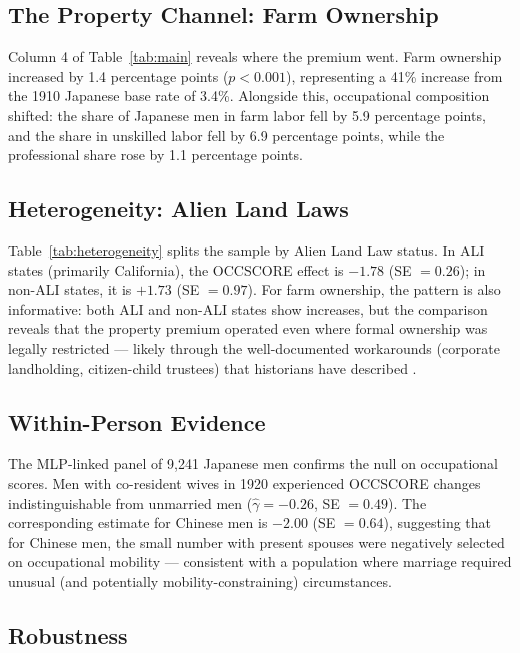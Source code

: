 \documentclass[12pt]{article}
\begin{document}
\subsection{The Property Channel: Farm Ownership}

Column 4 of Table~\ref{tab:main} reveals where the premium went. Farm ownership increased by 1.4 percentage points ($p < 0.001$), representing a 41\% increase from the 1910 Japanese base rate of 3.4\%. Alongside this, occupational composition shifted: the share of Japanese men in farm labor fell by 5.9 percentage points, and the share in unskilled labor fell by 6.9 percentage points, while the professional share rose by 1.1 percentage points.

\subsection{Heterogeneity: Alien Land Laws}



Table~\ref{tab:heterogeneity} splits the sample by Alien Land Law status. In ALI states (primarily California), the OCCSCORE effect is $-1.78$ (SE $= 0.26$); in non-ALI states, it is $+1.73$ (SE $= 0.97$). For farm ownership, the pattern is also informative: both ALI and non-ALI states show increases, but the comparison reveals that the property premium operated even where formal ownership was legally restricted --- likely through the well-documented workarounds (corporate landholding, citizen-child trustees) that historians have described \citep{arai2020alien}.

\subsection{Within-Person Evidence}

The MLP-linked panel of 9,241 Japanese men confirms the null on occupational scores. Men with co-resident wives in 1920 experienced OCCSCORE changes indistinguishable from unmarried men ($\hat{\gamma} = -0.26$, SE $= 0.49$). The corresponding estimate for Chinese men is $-2.00$ (SE $= 0.64$), suggesting that for Chinese men, the small number with present spouses were negatively selected on occupational mobility --- consistent with a population where marriage required unusual (and potentially mobility-constraining) circumstances.

\subsection{Robustness}
\end{document}
